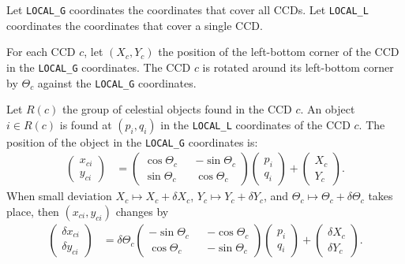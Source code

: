 \documentclass{scrartcl}
\begin{document}
Let \texttt{LOCAL\_G} coordinates the coordinates that cover all CCDs.
Let \texttt{LOCAL\_L} coordinates the coordinates that cover a single CCD.

For each CCD $c$, let $(X_c, Y_c)$ the position of the left-bottom corner of the CCD
in the \texttt{LOCAL\_G} coordinates.
The CCD $c$ is rotated around its left-bottom corner by $\Theta_c$
against the \texttt{LOCAL\_G} coordinates.

Let $R(c)$ the group of celestial objects found in the CCD $c$.
An object $i \in R(c)$ is found at $(p_i, q_i)$ in the \texttt{LOCAL\_L} coordinates
of the CCD $c$. The position of the object in the \texttt{LOCAL\_G} coordinates is:
\begin{align}
    \begin{pmatrix}
        x_{ci} \\ y_{ci}
    \end{pmatrix}
    &= \begin{pmatrix}
        \cos \Theta_c && -\sin \Theta_c
    \\  \sin \Theta_c &&  \cos \Theta_c
    \end{pmatrix}
        \begin{pmatrix}
            p_i \\ q_i
        \end{pmatrix}
        + \begin{pmatrix}
            X_c \\ Y_c
        \end{pmatrix}
    .
\end{align}
When small deviation $X_c \mapsto X_c + \delta X_c$, $Y_c \mapsto Y_c + \delta Y_c$,
and $\Theta_c \mapsto \Theta_c + \delta \Theta_c$ takes place, then $(x_{ci}, y_{ci})$
changes by
\begin{align}
    \begin{pmatrix}
        \delta x_{ci} \\ \delta y_{ci}
    \end{pmatrix}
    &= \delta \Theta_c
        \begin{pmatrix}
            -\sin \Theta_c && -\cos \Theta_c
        \\   \cos \Theta_c && -\sin \Theta_c
        \end{pmatrix}
        \begin{pmatrix}
            p_i \\ q_i
        \end{pmatrix}
        + \begin{pmatrix}
            \delta X_c \\ \delta Y_c
        \end{pmatrix}
    .
\end{align}
\end{document}
